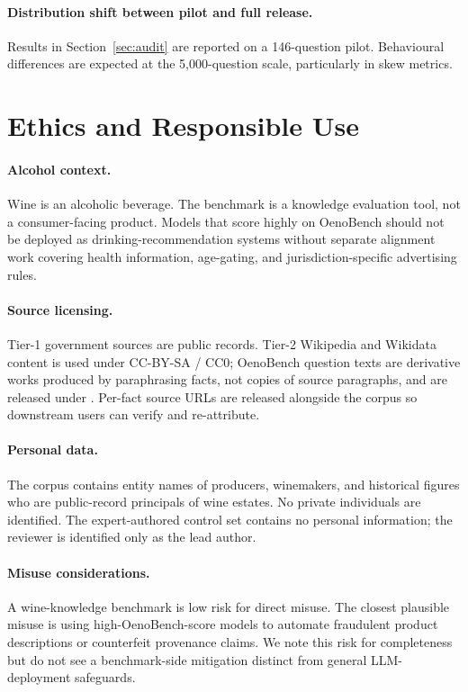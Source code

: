 \paragraph{Distribution shift between pilot and full release.} Results in Section~\ref{sec:audit} are reported on a 146-question pilot. Behavioural differences are expected at the 5{,}000-question scale, particularly in skew metrics. 

\section{Ethics and Responsible Use}
\label{sec:ethics}

\paragraph{Alcohol context.} Wine is an alcoholic beverage. The benchmark is a knowledge evaluation tool, not a consumer-facing product. Models that score highly on OenoBench should not be deployed as drinking-recommendation systems without separate alignment work covering health information, age-gating, and jurisdiction-specific advertising rules.

\paragraph{Source licensing.} Tier-1 government sources are public records. Tier-2 Wikipedia and Wikidata content is used under CC-BY-SA / CC0; OenoBench question texts are derivative works produced by paraphrasing facts, not copies of source paragraphs, and are released under . Per-fact source URLs are released alongside the corpus so downstream users can verify and re-attribute.

\paragraph{Personal data.} The corpus contains entity names of producers, winemakers, and historical figures who are public-record principals of wine estates. No private individuals are identified. The expert-authored control set contains no personal information; the reviewer is identified only as the lead author.

\paragraph{Misuse considerations.} A wine-knowledge benchmark is low risk for direct misuse. The closest plausible misuse is using high-OenoBench-score models to automate fraudulent product descriptions or counterfeit provenance claims. We note this risk for completeness but do not see a benchmark-side mitigation distinct from general LLM-deployment safeguards.
